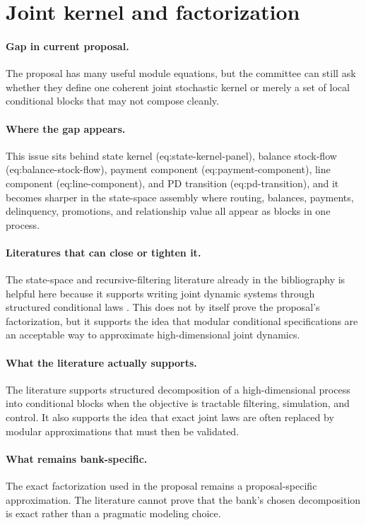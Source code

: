 \documentclass[11pt]{article}
\begin{document}
\section{Joint kernel and factorization}

\paragraph{Gap in current proposal.}
The proposal has many useful module equations, but the committee can still ask
whether they define one coherent joint stochastic kernel or merely a set of local
conditional blocks that may not compose cleanly.

\paragraph{Where the gap appears.}
This issue sits behind state kernel (eq:state-kernel-panel),
balance stock-flow (eq:balance-stock-flow), payment component
(eq:payment-component), line component (eq:line-component), and PD transition
(eq:pd-transition), and it becomes sharper in the state-space assembly where
routing, balances, payments, delinquency, promotions, and relationship value all
appear as blocks in one process.

\paragraph{Literatures that can close or tighten it.}
The state-space and recursive-filtering literature already in the bibliography is
helpful here because it supports writing joint dynamic systems through
structured conditional laws \citep{durbinkoopman2012ssm,westharrison1997bfdm,
doucet2001smc,ledoux2005recursivefilters}. This does not by itself prove the
proposal's factorization, but it supports the idea that modular conditional
specifications are an acceptable way to approximate high-dimensional joint
dynamics.

\paragraph{What the literature actually supports.}
The literature supports structured decomposition of a high-dimensional process
into conditional blocks when the objective is tractable filtering, simulation,
and control. It also supports the idea that exact joint laws are often replaced
by modular approximations that must then be validated.

\paragraph{What remains bank-specific.}
The exact factorization used in the proposal remains a proposal-specific
approximation. The literature cannot prove that the bank's chosen decomposition
is exact rather than a pragmatic modeling choice.
\end{document}
